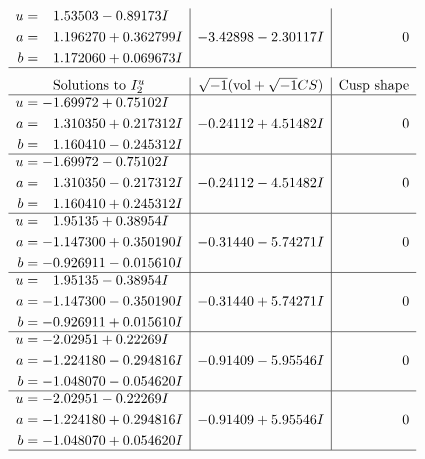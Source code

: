 \documentclass[1p]{elsarticle_modified}
\theoremstyle{definition}
\newcommand{\I}{\sqrt{-1}}
\begin{document}
$$\begin{array}{c|c|c}
\begin{aligned}
u &= \phantom{-}1.53503 - 0.89173 I \\
a &= \phantom{-}1.196270 + 0.362799 I \\
b &= \phantom{-}1.172060 + 0.069673 I\end{aligned}
 & -3.42898 - 2.30117 I & \phantom{-0.000000 } 0\\
 \hline 
 \end{array}$$\newpage$$\begin{array}{c|c|c}  
\text{Solutions to }I^u_{2}& \I (\text{vol} + \sqrt{-1}CS) & \text{Cusp shape}\\
 \hline 
\begin{aligned}
u &= -1.69972 + 0.75102 I \\
a &= \phantom{-}1.310350 + 0.217312 I \\
b &= \phantom{-}1.160410 - 0.245312 I\end{aligned}
 & -0.24112 + 4.51482 I & \phantom{-0.000000 } 0 \\ \hline\begin{aligned}
u &= -1.69972 - 0.75102 I \\
a &= \phantom{-}1.310350 - 0.217312 I \\
b &= \phantom{-}1.160410 + 0.245312 I\end{aligned}
 & -0.24112 - 4.51482 I & \phantom{-0.000000 } 0 \\ \hline\begin{aligned}
u &= \phantom{-}1.95135 + 0.38954 I \\
a &= -1.147300 + 0.350190 I \\
b &= -0.926911 - 0.015610 I\end{aligned}
 & -0.31440 - 5.74271 I & \phantom{-0.000000 } 0 \\ \hline\begin{aligned}
u &= \phantom{-}1.95135 - 0.38954 I \\
a &= -1.147300 - 0.350190 I \\
b &= -0.926911 + 0.015610 I\end{aligned}
 & -0.31440 + 5.74271 I & \phantom{-0.000000 } 0 \\ \hline\begin{aligned}
u &= -2.02951 + 0.22269 I \\
a &= -1.224180 - 0.294816 I \\
b &= -1.048070 - 0.054620 I\end{aligned}
 & -0.91409 - 5.95546 I & \phantom{-0.000000 } 0 \\ \hline\begin{aligned}
u &= -2.02951 - 0.22269 I \\
a &= -1.224180 + 0.294816 I \\
b &= -1.048070 + 0.054620 I\end{aligned}
 & -0.91409 + 5.95546 I & \phantom{-0.000000 } 0\\
 \hline 
 \end{array}$$\newpage\newpage\renewcommand{\arraystretch}{1}
\end{document}
